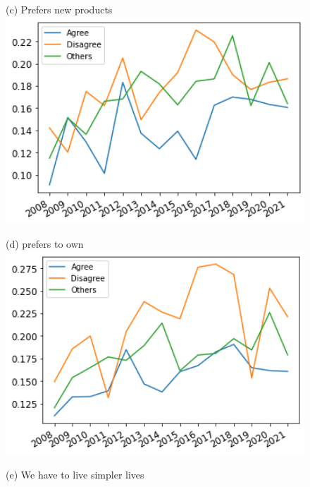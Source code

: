 \documentclass[12pt]{article}
\begin{document}
\begin{figure}[h!!]
	\begin{minipage}[h!!]{0.32\textwidth}  
		\centering\footnotesize{(c) Prefers new products}
		\includegraphics[width=1\textwidth]{../codding_data/results/liss/broad_groups_notnecessaryqk20a148_ci307.png}
	\end{minipage}
	\begin{minipage}[h!!]{0.32\textwidth}  
		\centering\footnotesize{(d) prefers to own}
		\includegraphics[width=1\textwidth]{../codding_data/results/liss/broad_groups_notnecessaryqk20a144_ci307.png}
	\end{minipage}
	\begin{minipage}[h!!]{0.32\textwidth}  
		\centering\footnotesize{(e) We have to live simpler lives}

\end{minipage}
\end{figure}
\end{document}
